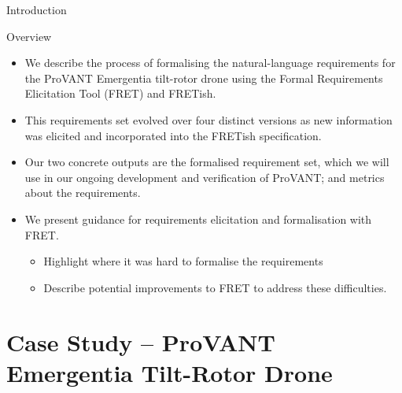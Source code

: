 \documentclass[11pt, aspectratio=169, table]{beamer}
\begin{document}
\begin{frame}{Introduction}

\begin{block}{Overview}

\begin{itemize}
    \item We describe the process of formalising the natural-language requirements for the ProVANT Emergentia tilt-rotor drone using the Formal Requirements Elicitation Tool (FRET) and FRETish.

    \item This requirements set evolved over four distinct versions as new information was elicited and incorporated into the FRETish specification.

    \item Our two concrete outputs are the formalised requirement set, which we will use in our ongoing development and verification of ProVANT; and metrics about the requirements.
    
    \item We present guidance for requirements elicitation and formalisation with FRET.  
    \begin{itemize}
    \item Highlight where it was hard to formalise the requirements
    \item Describe potential improvements to FRET to address these difficulties.
    \end{itemize}
	
\end{itemize}
\end{block}
\end{frame}

\section{Case Study -- ProVANT Emergentia Tilt-Rotor Drone}
\end{document}
